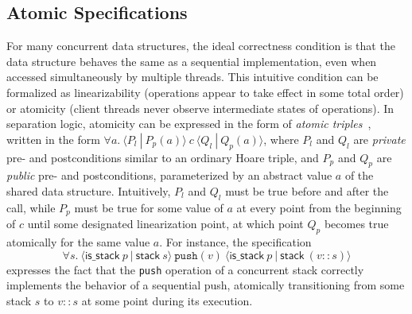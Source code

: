 \documentclass[a4paper,USenglish,cleveref, autoref, thm-restate]{lipics-v2021}
\begin{document}
\subsection{Atomic Specifications}
\label{atomic}
For many concurrent data structures, the ideal correctness condition is that the data structure behaves the same as a sequential implementation, even when accessed simultaneously by multiple threads. This intuitive condition can be formalized as linearizability (operations appear to take effect in some total order) or atomicity (client threads never observe intermediate states of operations). In separation logic, atomicity can be expressed in the form of \emph{atomic triples}~\cite{tada}, written in the form $\forall a.\ \langle P_l\ |\ P_p(a)\rangle\ c\ \langle Q_l\ |\ Q_p(a)\rangle$, where $P_l$ and $Q_l$ are \emph{private} pre- and postconditions similar to an ordinary Hoare triple, and $P_p$ and $Q_p$ are \emph{public} pre- and postconditions, parameterized by an abstract value $a$ of the shared data structure. Intuitively, $P_l$ and $Q_l$ must be true before and after the call, while $P_p$ must be true for some value of $a$ at every point from the beginning of $c$ until some designated linearization point, at which point $Q_p$ becomes true atomically for the same value $a$. For instance, the specification $$\forall s.\ \langle \mathsf{is\_stack}\ p\ |\ \mathsf{stack}\ s\rangle\ \texttt{push}(v)\ \langle \mathsf{is\_stack}\ p\ |\ \mathsf{stack}\ (v :: s)\rangle$$ expresses the fact that the \texttt{push} operation of a concurrent stack correctly implements the behavior of a sequential push, atomically transitioning from some stack $s$ to $v :: s$ at some point during its execution. %
\end{document}
